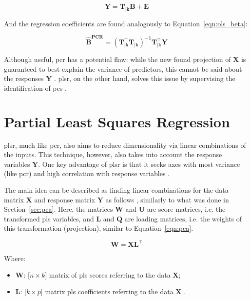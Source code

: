 	\begin{equation}
		\label{eqn:pcr}
		\mathbf{Y = T_{|k} B + E}
	\end{equation}

And the regression coefficients are found analogously to Equation~\ref{eqn:ols_beta}:

\begin{equation}
	\label{eqn:beta-pcr}
	\mathbf{\hat{B}^{\text{PCR}} = (T_{|k}^\intercal T_{|k})^{-1}T_{|k}^\intercal Y}
\end{equation}

Although useful, \acrshort{pcr} has a potential flaw: while the new found projection of $\mathbf{X}$ is guaranteed to best explain the variance of predictors, this cannot be said about the responses $\mathbf{Y}$ \parencite{james2013introduction}. \acrshort{plsr}, on the other hand, solves this issue by supervising the identification of \acrshort{pc}s \parencite{james2013introduction}.
	
\section{Partial Least Squares Regression}
\label{sec:plsr}

\acrshort{plsr}, much like \acrshort{pcr}, also aims to reduce dimensionality via linear combinations of the inputs. This technique, however, also takes into account the response variables $\mathbf{Y}$. One key advantage of \acrshort{plsr} is that it seeks axes with most variance (like \acrshort{pcr}) and high correlation with response variables \parencite{friedman2001}.

The main idea can be described as  finding  linear combinations  for the data matrix $\mathbf{X}$ and response matrix $\mathbf{Y}$ as follows \parencite{ng2013}, similarly to what was done in Section~\ref{sec:pca}. Here, the matrices $\mathbf{W}$ and $\mathbf{U}$ are score matrices, i.e. the transformed \acrshort{pls} variables, and $\mathbf{L}$ and $\mathbf{Q}$ are loading matrices, i.e. the weights of this transformation (projection), similar to Equation~\ref{eqn:pca}.

\begin{equation}
	\label{eqn:x-decomp}
	\mathbf{W=XL^\intercal}
\end{equation}

Where:
\begin{itemize}
	\item $\mathbf{W}$: [$n \times k]$ matrix of \acrshort{pls} scores referring to the data $\mathbf{X}$;
	\item $\mathbf{L}$: [$k\times p]$ matrix \acrshort{pls} coefficients referring to the data $\mathbf{X}$ .
\end{itemize}

